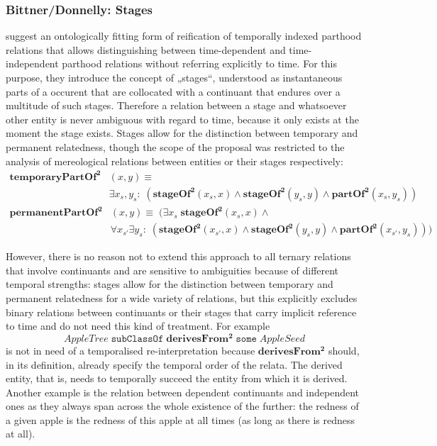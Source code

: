 \documentclass{ao2e}
\newcommand{\mirel}[1]{\ensuremath{\mathrm{\mathbf{#1}}}}
\newcommand{\mclass}[1]{\ensuremath{\mathit{#1}}}
\newcommand{\mrel}[2]{\mirel{#1^#2}}
\newcommand{\mrelb}[1]{\mrel{#1}{2}}
\begin{document}
\subsubsection{Bittner/Donnelly: Stages}
\cite{Bittner:Donnelly} suggest an ontologically fitting form of reification of
temporally indexed parthood relations that allows distinguishing between
time-dependent and time-independent parthood relations without referring
explicitly to time. For this purpose, they introduce the
concept of „stages“, understood as instantaneous parts of a occurent that are
collocated with a continuant that endures over a multitude of such stages.
Therefore a relation
between a stage and whatsoever other entity is never ambiguous with regard to
time, because it only exists at the moment the stage exists. Stages allow for
the distinction between temporary and permanent relatedness, though the scope of
the proposal was restricted to the analysis of mereological relations between
entities or their stages respectively:
\begin{equation}
\begin{split}
\mrelb{temporaryPartOf}&(x,y) \equiv \\ &\exists x_s,y_s:\; (\mrelb{stageOf}(x_s,x)
  \wedge \mrelb{stageOf}(y_s,y) \wedge
 \mrelb{partOf}(x_s, y_s))
\end{split}
\end{equation}
\begin{equation}
\begin{split}
\mrelb{permanentPartOf}&(x,y) \equiv\; (\exists x_s\; \mrelb{stageOf}(x_s, x)
  \wedge \\
 &\forall x_{s'}\exists y_s:\;(\mrelb{stageOf}(x_{s'},x) \wedge
\mrelb{stageOf}(y_s,y)   \wedge
 \mrelb{partOf}(x_{s'},y_s)))
\end{split}
\end{equation}


However, there is no reason not to extend this approach to all ternary relations
that involve continuants and are sensitive to ambiguities because of different
temporal strengths: stages allow for the distinction between temporary and
permanent relatedness for a wide variety of relations, but this explicitly
excludes binary relations between continuants or their stages that carry
implicit reference to time and do not need this kind of treatment. For example 
\begin{equation}
\mclass{AppleTree}\;\mathtt{subClassOf}\;\mrelb{derivesFrom}\;\mathtt{some}\;
\mclass{AppleSeed}
\end{equation}
is not in need of a temporalised re-interpretation because \mrelb{derivesFrom} should,
in its definition, already specify the temporal order of the relata. The derived
entity, that is, needs to temporally succeed the entity from which it is
derived. Another example is the relation between dependent continuants and
independent ones as they always span across the whole existence of the further:
the redness of a given apple is the redness of this apple at all times (as long
as there is redness at all). 
\end{document}
